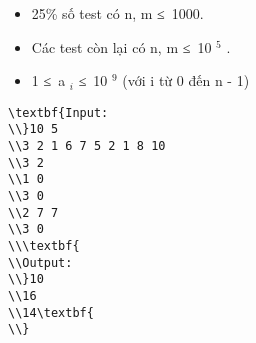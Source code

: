 \begin{itemize}
	\item     25\% số test có n, m ≤ 1000.   
	\item     Các test còn lại có n, m ≤ 10    $^     5    $    .   
	\item     1 ≤ a    $_     i    $    ≤ 10    $^     9    $    (với i từ 0 đến n - 1)   
\end{itemize}
\begin{verbatim}
\textbf{Input:
\\}10 5
\\3 2 1 6 7 5 2 1 8 10
\\3 2
\\1 0
\\3 0
\\2 7 7
\\3 0
\\\textbf{
\\Output:
\\}10
\\16
\\14\textbf{
\\}\end{verbatim}